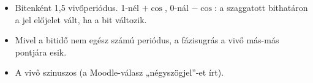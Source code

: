\begin{rajz}
\begin{center}
\end{center}
\begin{itemize}
\item Bitenként 1,5 vivőperiódus. 1-nél $+\cos$, 0-nál $-\cos$: a szaggatott bithatáron a jel előjelet vált, ha a bit változik.
\item Mivel a bitidő nem egész számú periódus, a fázisugrás a vivő más-más pontjára esik.
\end{itemize}
\end{rajz}
\begin{eredmeny}

\begin{center}\end{center}
\end{eredmeny}
\begin{tipp}[Ellenőrzés]
\begin{itemize}
\item A vivő szinuszos (a Moodle-válasz „négyszögjel”-et írt).
\end{itemize}
\end{tipp}



